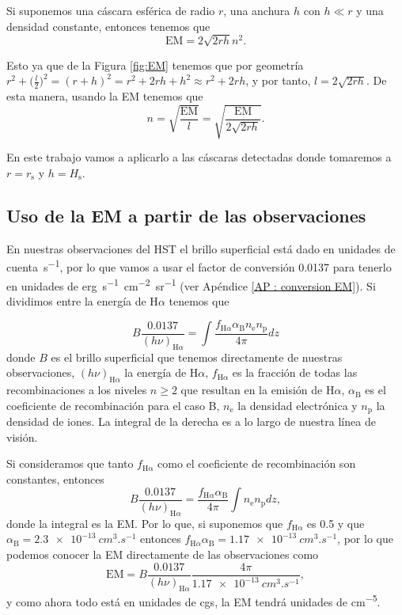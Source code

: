\documentclass{book}
\begin{document}
Si suponemos una cáscara esférica de radio $r$, una anchura $h$ con
$h\ll r$ y una densidad constante, entonces tenemos que
\begin{equation}
  \mathrm{EM}=2\sqrt{2rh}n^2.
\end{equation}

Esto ya que de la Figura \ref{fig:EM} tenemos que por geometría
$r^2+\Big(\frac{l}{2}\Big)^2=(r+h)^2=r^2+2rh+h^2\approx r^2+2rh$, y por
tanto, $ l=2\sqrt{2rh}$. De esta manera, usando la EM tenemos
que
\begin{equation}
  n=\sqrt{\frac{\mathrm{EM}}{l}}=\sqrt{\frac{\mathrm{EM}}{2\sqrt{2rh}}}.
\end{equation} 

En este trabajo vamos a aplicarlo a las cáscaras detectadas donde
tomaremos a $r=r_\mathrm{s}$ y $h=H_\mathrm{s}$.

\subsection{Uso de la EM a partir de las observaciones} \label{Subsec : EM}

En nuestras observaciones del HST el brillo superficial está dado en
unidades de \unit{cuenta.s^{-1}}, por lo que vamos a usar el factor de
conversión 0.0137 para tenerlo en unidades de
\unit{erg.s^{-1}.cm^{-2}.sr^{-1}} (ver Apéndice \ref{AP : conversion
  EM}). Si dividimos entre la energía de H$\alpha$ tenemos que

\begin{equation}
    B\frac{0.0137}{(h\nu)_{\mathrm{H}\alpha}}=\int \frac{f_{\mathrm{H}\alpha}\alpha_\mathrm{B} n_\mathrm{e} n_\mathrm{p}}{4\pi} dz
\end{equation}
donde $B$ es el brillo superficial que tenemos directamente de
nuestras observaciones, $(h\nu)_{\mathrm{H}\alpha}$ la energía de
H$\alpha$, $f_{\mathrm{H}\alpha}$ es la fracción de todas las recombinaciones a
los niveles $n\geq 2$ que resultan en la emisión de H$\alpha$,
$\alpha_\mathrm{B}$ es el coeficiente de recombinación para el caso B,
$n_\mathrm{e}$ la densidad electrónica y $n_\mathrm{p}$ la densidad de
iones. La integral de la derecha es a lo largo de nuestra línea de
visión.

Si consideramos que tanto $f_\mathrm{H\alpha}$ como el coeficiente de
recombinación son constantes, entonces
\begin{equation}
    B\frac{0.0137}{(h\nu)_{\mathrm{H}\alpha}}=\frac{f_{\mathrm{H}\alpha}\alpha_\mathrm{B}}{4\pi}\int n_\mathrm{e} n_\mathrm{p} dz,
\end{equation}
donde la integral es la EM. Por lo que, si suponemos que
$f_\mathrm{H\alpha}$ es 0.5 y que
$\alpha_\mathrm{B}=\SI{2.3e-13}{cm^{3}.s^{-1}}$ entonces
$f_{\mathrm{H}\alpha}\alpha_\mathrm{B}=\SI{1.17e-13}{cm^3.s^{-1}}$, por lo que
podemos conocer la EM directamente de las observaciones como
\begin{equation}
    \mathrm{EM} = B\frac{0.0137}{(h\nu)_{\mathrm{H}\alpha}}\frac{4\pi}{\SI{1.17e-13}{cm^3.s^{-1}}},
\end{equation}
y como ahora todo está en unidades de cgs, la EM tendrá unidades de \unit{cm^{-5}}.
\end{document}
